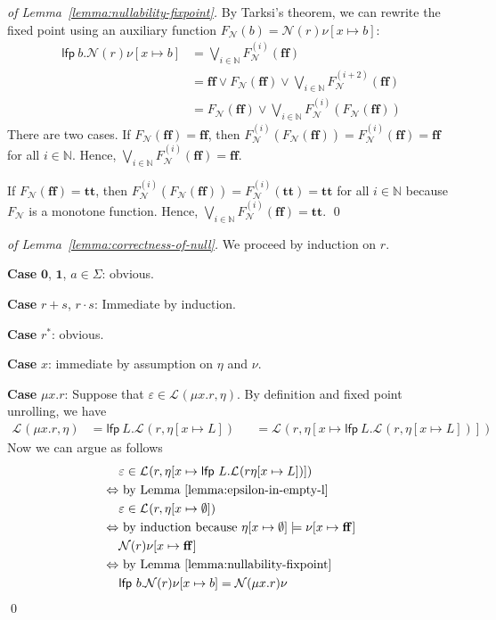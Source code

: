 \documentclass[runningheads, envcountsame, a4paper]{llncs}
\newcommand{\True}{\ensuremath{\mathbf{tt}}}%
\newcommand{\False}{\ensuremath{\mathbf{ff}}}%
\newcommand\nat{\mathbb{N}}
\newcommand\LFP{\textsf{lfp}}
\newcommand\Rnull{\mathbf0}
\newcommand\Rempty{\mathbf1}
\newcommand\Lang[1][{}]{\mathcal{L}^{#1}}
\newcommand\Null{\mathcal{N}}
\begin{document}
\begin{proof}[of Lemma~\ref{lemma:nullability-fixpoint}]
  By Tarksi's theorem, we can rewrite the fixed point using an auxiliary
  function $F_\Null (b) = \Null (r) \nu[x \mapsto b]$:
  \begin{align*}
    \LFP\ b.\Null (r)\nu[x \mapsto b]
    &= \bigvee_{i \in \nat} F_\Null^{(i)} (\False)
    \\
    &= \False \vee F_\Null (\False) \vee
    \bigvee_{i\in\nat}F_\Null^{(i+2)} (\False)
    \\
    &= F_\Null (\False) \vee
    \bigvee_{i\in\nat}F_\Null^{(i)} (F_\Null (\False))
  \end{align*}
  There are two cases. If $F_\Null (\False) = \False$, then
  $F_\Null^{(i)} (F_\Null (\False)) = F_\Null^{(i)} (\False) = \False$
  for all $i\in \nat$. Hence, $\bigvee_{i \in \nat} F_\Null^{(i)}
  (\False) = \False$.

  If $F_\Null (\False) = \True$, then
  $F_\Null^{(i)} (F_\Null (\False)) = F_\Null^{(i)} (\True) = \True$
  for all $i\in \nat$ because $F_\Null$ is a monotone function.
  Hence, $\bigvee_{i \in \nat} F_\Null^{(i)}
  (\False) = \True$.
  \qed
\end{proof}
\begin{proof}[of Lemma~\ref{lemma:correctness-of-null}]
  We proceed by induction on $r$.

  \textbf{Case }$\Rnull$, $\Rempty$, $a\in\Sigma$: obvious.

  \textbf{Case }$r + s$, $r \cdot s$: Immediate by induction.

  \textbf{Case }$r^*$: obvious.
  
  \textbf{Case }$x$: immediate by assumption on $\eta$ and $\nu$.

  \textbf{Case }$\mu x.r$:
  Suppose that $\varepsilon \in \Lang (\mu  x.r, {\eta})$.
  By definition and fixed point unrolling, we have
  \begin{align*}
    \Lang (\mu  x.r, {\eta})
    &= \LFP\ L. \Lang (r, { \eta[x \mapsto L]})
    &&= \Lang (r, { \eta[x \mapsto \LFP\ L. \Lang (r, \eta[x \mapsto L])]})
  \end{align*}
  Now we can argue as follows
  \begin{align*}
    & \varepsilon \in \Lang (r, { \eta[x \mapsto \LFP\ L. \Lang (r
    \eta[x \mapsto L])]})
    \\
    \Leftrightarrow & \text{ by Lemma~\ref{lemma:epsilon-in-empty-l}}
    \\
    & \varepsilon \in \Lang (r, { \eta[x \mapsto \emptyset]})
    \\
    \Leftrightarrow & \text{ by induction because $\eta[x \mapsto  \emptyset] \models \nu[x \mapsto \False]$}
    \\
    & \Null (r)\nu[x \mapsto\False]
    \\
    \Leftrightarrow & \text{ by
      Lemma~\ref{lemma:nullability-fixpoint}}
    \\
    & \LFP\ b.\Null (r)\nu[x\mapsto b] = \Null (\mu x.r)\nu
  \end{align*}
  \qed
\end{proof}
\end{document}
